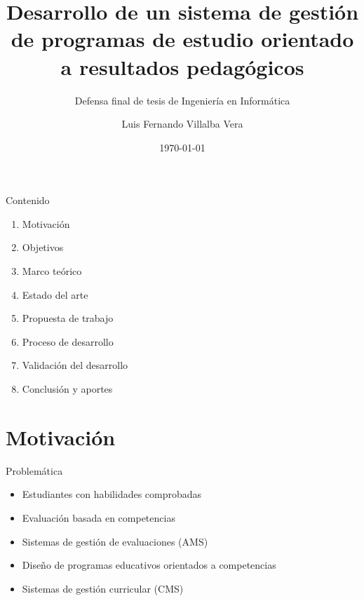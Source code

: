 \documentclass[10pt,xcolor=table ]{beamer}
\title{Desarrollo de un sistema de gestión de programas de estudio orientado a resultados pedagógicos}
\subtitle{Defensa final de tesis de Ingeniería en Informática}
\author{Luis Fernando Villalba Vera}
\institute{Universidad Católica - Nuestra Señora de la Asunción}
\date{\today}
\begin{document}
\maketitle

\begin{frame}{Contenido}
	\begin{enumerate}
	    \item Motivación
	    \item Objetivos
	    \item Marco teórico
	    \item Estado del arte
	    \item Propuesta de trabajo
	    \item Proceso de desarrollo
	    \item Validación del desarrollo
	    \item Conclusión y aportes
	 \end{enumerate}
\end{frame}

\section{Motivación}
\begin{frame}{Problemática}
  \begin{itemize}[<+- | alert@+>]
    \item Estudiantes con habilidades comprobadas
    \item Evaluación basada en competencias
    \item Sistemas de gestión de evaluaciones (AMS)
    \item Diseño de programas educativos orientados a competencias
    \item Sistemas de gestión curricular (CMS)
  \end{itemize}
\end{frame}
\end{document}
